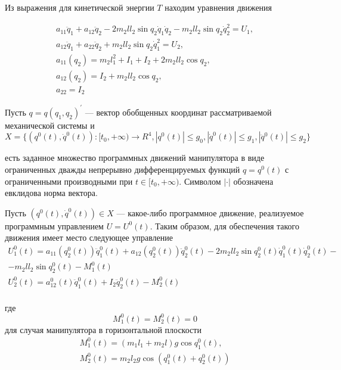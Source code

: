 Из выражения для кинетической энергии $T$ находим уравнения движения

\begin{equation}
\begin{array}{l}
a_{11} \ddot q_1 + a_{12} \ddot q_2 - 2 m_2 l l_2 \sin q_2 \dot q_1 \dot q_2 - m_2 l l_2 \sin q_2 \dot q_2^2 = U_1,\\ 
a_{12} \ddot q_1 + a_{22} \ddot q_2 + m_2 l l_2 \sin q_2 \dot q_1^2 = U_2,\\
a_{11} (q_2) = m_2 l_1^2 + I_1 + I_2 + 2 m_2 l l_2 \cos q_2,\\
a_{12} (q_2)= I_2 + m_2 l l_2 \cos q_2, \\
a_{22} = I_2
\end{array}
\end{equation}

Пусть $q=q(q_1, q_2)^{'}$ --– вектор обобщенных координат рассматриваемой механической системы и 
$$X = \{(q^0(t), \dot q^0(t)) : [t_0, + \infty) \to R^4, \left|q^0(t)\right| \le g_0, \left|\dot q^0(t) \right| \le g_1, \left|\ddot q^0(t)\right| \le g_2 \}$$

есть заданное множество программных движений манипулятора в виде ограниченных дважды непрерывно дифференцируемых функций $q=q^0(t)$ с ограниченными производными при $t \in [t_0, + \infty).$ Символом $\left| \cdot \right|$   обозначена евклидова норма вектора.

Пусть $(q^0(t), \dot q^0(t)) \in X$ --- какое-либо программное движение, реализуемое программным управлением $U = U^0(t).$ Таким образом, для обеспечения такого движения имеет место следующее управление
\begin{equation}
\begin{array}{l}
U_1^0 (t) = a_{11} (q_2^0 (t)) \ddot q_1^0 (t) + a_{12} (q_2^0 (t)) \ddot q_2^0 (t) - 2 m_2 l l_2 \sin q_2^0 (t) \dot q_1^0 (t) \dot q_2^0 (t) - \\ 
- m_2 l l_2 \sin q_2^0 (t) - M_1^0 (t) \\
U_2^0 (t) = a_{12}^0 (t) \ddot q_1^0 (t) + I_2 \ddot q_2^0 (t) - M_2^0 (t) \\
\end{array}
\end{equation}

где $$M_1^0(t) = M_2^0(t) = 0$$ для случая манипулятора в горизонтальной плоскости
\begin{equation}
\begin{array}{l}
M_1^0 (t) = (m_1 l_1 + m_2 l) g \cos q_1^0 (t), \\
M_2^0 (t) = m_2 l_2 g \cos (q_1^0 (t) + q_2^0 (t))
\end{array}
\end{equation}

